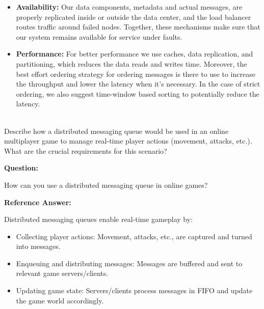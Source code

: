 \begin{itemize}
\begin{itemize}
\item
\textbf{Increase in the number of messages:} When the number of messages touches a specific limit---say, 80\%---the specified queue is expanded. Similarly, the queue is shrunk when the number of messages drops below a certain threshold.
\item
\textbf{Increase in the number of queues:} With an increasing number of queues, the demand for more servers also increases, in which case the cluster manager is responsible for adding extra servers. We commission nodes so that there is performance isolation between different queues. An increased load on one queue shouldn't impact other queues.
\end{itemize}
\item
\protect{}\label{zW6GjRPjcToAIMZI6I0EK}
\textbf{Availability:} Our data components, metadata and actual messages, are properly replicated inside or outside the data center, and the load balancer routes traffic around failed nodes. Together, these mechanisms make sure that our system remains available for service under faults.
\item
\protect{}\label{Nul1sG4sJlsneq78H53YY}
\textbf{Performance:} For better performance we use caches, data replication, and partitioning, which reduces the data reads and writes time. Moreover, the best effort ordering strategy for ordering messages is there to use to increase the throughput and lower the latency when it's necessary. In the case of strict ordering, we also suggest time-window based sorting to potentially reduce the latency.
\end{itemize}
\\
Describe how a distributed messaging queue would be used in an online multiplayer game to manage real-time player actions (movement, attacks, etc.). What are the crucial requirements for this scenario?

\textbf{Question:}

How can you use a distributed messaging queue in online games?

\textbf{Reference Answer:}

Distributed messaging queues enable real-time gameplay by:

\begin{itemize}
\tightlist
\item
Collecting player actions: Movement, attacks, etc., are captured and turned into messages.
\item
Enqueuing and distributing messages: Messages are buffered and sent to relevant game servers/clients.
\item
Updating game state: Servers/clients process messages in FIFO and update the game world accordingly.
\end{itemize}

